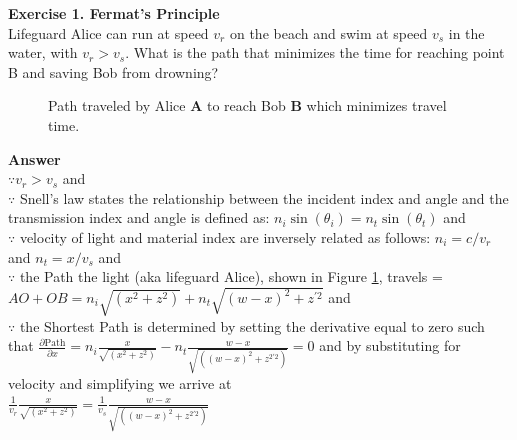 \documentclass[main.tex]{subfiles}
\begin{document}
\textbf{Exercise 1. Fermat's Principle}\\
Lifeguard Alice can run at speed $v_r$ on the beach and swim at speed $v_s$ in the water, with $v_r > v_s$. What is the path that minimizes the time for reaching point B and saving Bob from drowning?


\begin{figure}
\centering{}
\caption{Path traveled by Alice \textbf{A} to reach Bob \textbf{B} which minimizes travel time.}
\label{fig:1}
\end{figure}

\textbf{Answer}\\
$\because v_r > v_s$ and \\
$\because$ Snell's law states the relationship between the incident index and angle and the transmission index and angle is defined as: $n_i\sin(\theta_i) = n_t \sin(\theta_{t})$ and\\
$\because$ velocity of light and material index are inversely related as follows:  $n_i = c / v_r$ and $n_t = x / v_s$ and \\
$\because$ the Path the light  (aka lifeguard Alice), shown in Figure \ref{fig:1},  travels  = $AO + OB = n_i \sqrt{(x^2 + z^2)} + n_t \sqrt{(w-x)^2 +  z^{\prime 2}}$ and\\
$\because$ the Shortest Path is determined by setting the derivative equal to zero such that $ \frac{\partial \text{Path}}{\partial x} = n_i \frac{x}{\sqrt{(x^2 + z^2)}} - n_t \frac{w-x}{\sqrt{((w-x)^2 + z^{2\prime 2})}} = 0$ and by substituting for velocity and simplifying we arrive at\\
$\frac{1}{v_r} \frac{x}{\sqrt{(x^2 + z^2)}} = \frac{1}{v_s} \frac{w-x}{\sqrt{((w-x)^2 + z^{2\prime 2})}} $ \\
\end{document}
